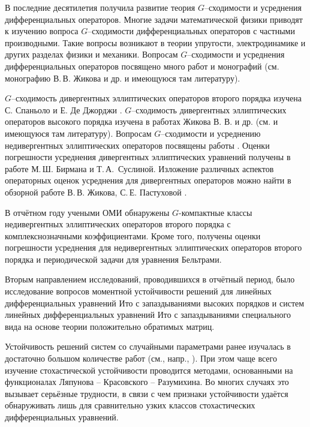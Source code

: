 \Introduction




В последние десятилетия получила развитие теория $G$--сходимости и усреднения дифференциальных
операторов. Многие задачи математической
физики приводят к изучению вопроса $G$--сходимости дифференциальных
операторов с частными производными. Такие вопросы возникают в теории упругости,
электродинамике и других разделах физики и механики. Вопросам
$G$--сходимости и усреднения дифференциальных
операторов посвящено много работ и монографий (см. монографию В.\,В. Жикова и др.
\cite{smm_ZhKO} и имеющуюся там литературу).

$G$--сходимость дивергентных эллиптических операторов второго порядка изучена
С. Спаньоло и Е. Де Джорджи \cite{smm_Dg1, smm_Dg2, smm_Dg3}.
$G$--сходимость дивергентных эллиптических операторов высокого порядка изучена в
работах Жикова В. В. и др. (см. \cite{smm_ZhKO} и имеющуюся там литературу).
Вопросам $G$--сходимости и усреднению недивергентных эллиптических операторов
посвящены работы \cite{smm_ZhS, smm_ZhS1, smm_Sir1,smm_Sir}.
Оценки погрешности усреднения  дивергентных эллиптических уравнений  получены в работе  \cite{smm_Sus} М.\,Ш. Бирмана и
  Т.\,А.~Суслиной.
Изложение различных аспектов операторных оценок усреднения для дивергентных
операторов можно найти в обзорной работе В.\,В. Жикова,
С.\,Е. Пастуховой  \cite{smm_VP}.

В отчётном году учеными ОМИ обнаружены $G$-компактные классы недивергентных эллиптических операторов второго порядка с комплекснозначными коэффициентами.
Кроме того, получены оценки погрешности усреднения для недивергентных
эллиптических операторов второго порядка и периодической задачи для уравнения Бельтрами.



Вторым направлением исследований, проводившихся в отчётный период, было исследование вопросов моментной устойчивости решений для линейных дифференциальных уравнений Ито с запаздываниями высоких порядков и систем линейных дифференциальных уравнений Ито с запаздываниями специального вида на основе теории положительно обратимых матриц.

Устойчивость решений систем со случайными параметрами ранее изучалась в достаточно большом количестве работ (см., напр., \cite{kri-bib-1, kri-bib-2, kri-bib-3, kri-bib-4}). При этом чаще всего изучение стохастической устойчивости проводится методами, основанными на функционалах Ляпунова -- Красовского -- Разумихина.
Во многих случаях это вызывает серьёзные трудности, в связи с чем признаки устойчивости удаётся обнаруживать лишь для сравнительно узких классов стохастических дифференциальных уравнений.

